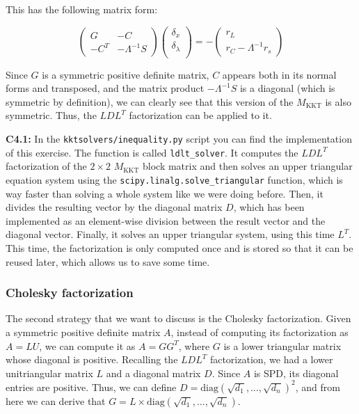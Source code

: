 \documentclass[11pt,a4paper]{article}
\begin{document}
This has the following matrix form:

\begin{equation}
  \begin{pmatrix}
    G & -C \\
    -C^T & -\Lambda^{-1}S
  \end{pmatrix}
  \begin{pmatrix}
    \delta_x \\
    \delta_{\lambda} \\
  \end{pmatrix}
  =
  -
 \begin{pmatrix}
   r_L \\
   r_C - \Lambda^{-1}r_s
 \end{pmatrix}
\end{equation}

Since $G$ is a symmetric positive definite matrix, $C$ appears both in its normal
forms and transposed, and the matrix product $-\Lambda^{-1}S$ is a diagonal (which
is symmetric by definition), we can clearly see that this version of the $M_{\text{KKT}}$
is also symmetric. Thus, the $LDL^T$ factorization can be applied to it.

\noindent \textbf{C4.1:} In the \texttt{kktsolvers/inequality.py} script you can find the
implementation of this exercise. The function is called \texttt{ldlt\_solver}. It computes
the $LDL^T$ factorization of the $2 \times 2$ $M_{\text{KKT}}$ block matrix and then solves an
upper triangular equation system using the \texttt{scipy.linalg.solve\_triangular} function,
which is way faster than solving a whole system like we were doing before. Then, it divides
the resulting vector by the diagonal matrix $D$, which has been implemented as an element-wise
division between the result vector and the diagonal vector. Finally, it solves an upper triangular
system, using this time $L^T$. This time, the factorization is only computed once and is stored
so that it can be reused later, which allows us to save some time.

\subsubsection{Cholesky factorization}

The second strategy that we want to discuss is the Cholesky factorization. Given a symmetric
positive definite matrix $A$, instead of computing its factorization as $A = LU$, we can compute
it as $A = GG^T$, where $G$ is a lower triangular matrix whose diagonal is positive. Recalling
the $LDL^T$ factorization, we had a lower unitriangular matrix $L$ and a diagonal matrix $D$.
Since $A$ is SPD, its diagonal entries are positive. Thus, we can define
$D = \text{diag}(\sqrt{d_1}, \dots, \sqrt{d_n})^2$, and from here we can
derive that $G = L \times \text{diag}(\sqrt{d_1}, \dots, \sqrt{d_n})$.
\end{document}
